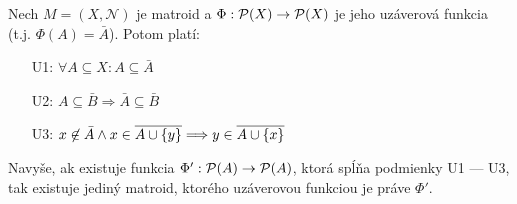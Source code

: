 \begin{theorem}
\label{th:m_closure}
Nech $M = (X, \mathcal{N})$ je matroid a $\Phi:\mathcal{P}(X) \to \mathcal{P}(X)$ je jeho uzáverová funkcia (t.j. $\Phi(A) = \bar{A}$).
Potom platí:
\begin{enumerate}
    \item[U1:] $\forall A \subseteq X: A \subseteq \bar{A}$
    \item[U2:] $A \subseteq \bar{B} \Longrightarrow \bar{A} \subseteq \bar{B}$
    \item[U3:] $x \not\in \bar{A} \wedge x \in \overline{A \cup \left\{y\right\}} \Longrightarrow y \in \overline{A \cup \left\{x\right\}}$
\end{enumerate}

Navyše, ak existuje funkcia $\Phi': \mathcal{P}(A) \to \mathcal{P}(A)$, ktorá spĺňa podmienky U1 --- U3, tak existuje jediný matroid,
ktorého uzáverovou funkciou je práve $\Phi'$.
\end{theorem}

